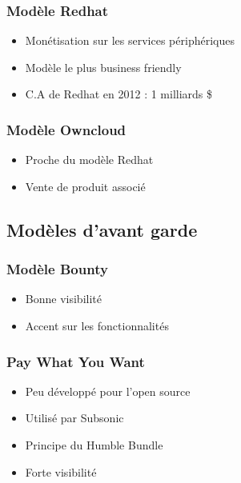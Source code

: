 \begin{frame}   %
\frametitle{Modèle Redhat}

\begin{itemize}
    \itemsep1.5em
    \item Monétisation sur les services périphériques
    \item Modèle le plus business friendly
    \item C.A de Redhat en 2012 : 1 milliards \${}
\end{itemize}
\end{frame}


\begin{frame}
\frametitle{Modèle Owncloud}

\begin{itemize}
    \itemsep1.5em
    \item Proche du modèle Redhat
    \item Vente de produit associé
\end{itemize}
\end{frame}


    \subsection{Modèles d'avant garde}


\begin{frame}
\frametitle{Modèle Bounty}

\begin{itemize}
    \itemsep1.5em
    \item Bonne visibilité
    \item Accent sur les fonctionnalités
\end{itemize}
\end{frame}


\begin{frame}
\frametitle{Pay What You Want}

\begin{itemize}
    \itemsep1.5em
    \item Peu développé pour l'open source
    \item Utilisé par Subsonic
    \item Principe du Humble Bundle
    \item Forte visibilité
\end{itemize}
\end{frame}


